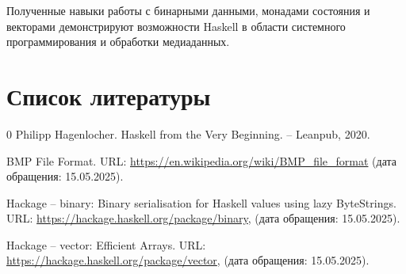 \documentclass[a4paper, final]{article}
\begin{document}
	Полученные навыки работы с бинарными данными, монадами состояния и векторами демонстрируют возможности Haskell в области системного программирования и обработки медиаданных.
	
	\newpage
	\section*{Список литературы}
	
	\vspace{-1.5cm}
	\begin{thebibliography}{0}
		Philipp Hagenlocher. Haskell from the Very Beginning. -- Leanpub, 2020.
		
		BMP File Format. URL: \url{https://en.wikipedia.org/wiki/BMP_file_format} (дата обращения: 15.05.2025).
		
		Hackage -- binary: Binary serialisation for Haskell values using lazy ByteStrings. URL: \url{https://hackage.haskell.org/package/binary}, (дата обращения: 15.05.2025).
		
		Hackage -- vector: Efficient Arrays. URL: \url{https://hackage.haskell.org/package/vector}, (дата обращения: 15.05.2025).
	\end{thebibliography}
\end{document}
